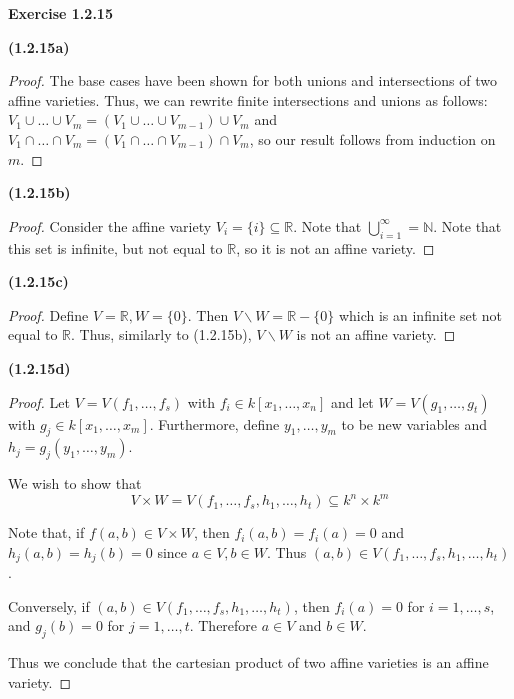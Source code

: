 \documentclass[12pt,oneside]{article}
\newenvironment{exercise}[1]{\vspace{.1in}\noindent\textbf{Exercise #1 \hspace{.05em}}}{}
\newcommand{\R}{\mathbb{R}}
\newcommand{\N}{\mathbb{N}}
\begin{document}
\begin{exercise}{1.2.15}

    \bigskip
    \textbf{(1.2.15a)}
    \begin{proof}
        The base cases have been shown for both unions and intersections of two affine varieties. Thus, we can rewrite finite intersections and unions as follows:
        $V_1 \cup \ldots \cup V_m = (V_1 \cup \ldots \cup V_{m-1}) \cup V_m$ and 
        $V_1 \cap \ldots \cap V_m = (V_1 \cap \ldots \cap V_{m-1}) \cap V_m$, so 
        our result follows from induction on $m$.
    \end{proof}
    
    \bigskip
    \textbf{(1.2.15b)}
    \begin{proof}
        Consider the affine variety $V_i = \{i\} \subseteq \R$. Note that 
        $\bigcup_{i = 1}^\infty = \N$. Note that this set is infinite, but 
        not equal to $\R$, so it is not an affine variety.
    \end{proof}
    
    \bigskip
    \textbf{(1.2.15c)}
    \begin{proof}
        Define $V = \R, W = \{0\}$. Then $V\backslash W = \R - \{0\}$ which is an infinite 
        set not equal to $\R$. Thus, similarly to (1.2.15b), $V\backslash W$ is not an affine 
        variety.
    \end{proof}
    
    \newpage
    \textbf{(1.2.15d)}
    \begin{proof}
        Let $V = V(f_1,\ldots, f_s)$ with $f_i \in k[x_1, \ldots, x_n]$ and let 
        $W = V(g_1, \ldots, g_t)$ with $g_j \in k[x_1, \ldots, x_m]$. Furthermore, 
        define $y_1, \ldots, y_m$ to be new variables and $h_j = g_j(y_1,\ldots, y_m)$.
        
        We wish to show that 
        \[
            V \times W = V(f_1, \ldots, f_s, h_1, \ldots, h_t) \subseteq k^n \times k^m
        \]
        
        Note that, if $f(a,b) \in V \times W$, then $f_i(a,b) = f_i(a) = 0$ and 
        $h_j(a,b) = h_j(b) = 0$ since $a \in V, b \in W$. Thus $(a,b) \in V(f_1, \ldots, f_s, h_1, \ldots, h_t)$.
        
        Conversely, if $(a,b) \in V(f_1, \ldots, f_s, h_1, \ldots, h_t)$, then $f_i(a) = 0$ 
        for $i = 1, \ldots, s$, and $g_j(b) = 0$ for $j = 1, \ldots, t$. Therefore $a \in V$
        and $b \in W$.
        
        Thus we conclude that the cartesian product of two affine varieties is an affine 
        variety.
    \end{proof}
\end{exercise}


\end{document}
